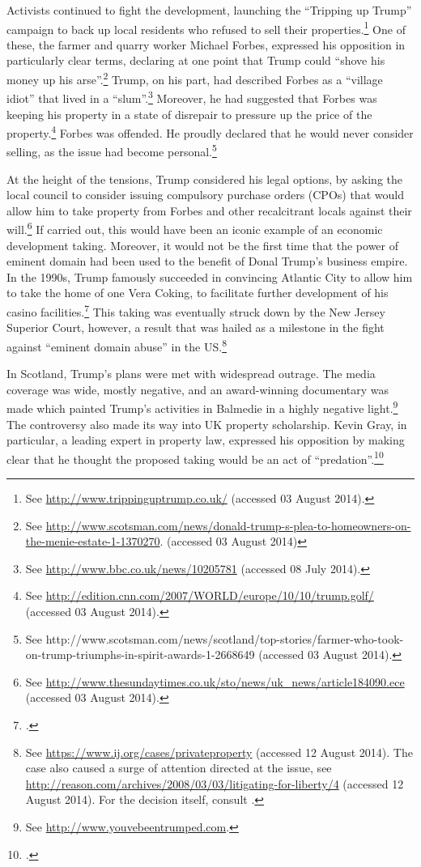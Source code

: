 \documentclass[12pt,a4paper]{book} %
\begin{document}
Activists continued to fight the development, launching the ``Tripping up Trump'' campaign to back up local residents who refused to sell their properties.\footnote{See \url{http://www.trippinguptrump.co.uk/} (accessed 03 August 2014).} One of these, the farmer and quarry worker Michael Forbes, expressed his opposition in particularly clear terms, declaring at one point that Trump could ``shove his money up his arse''.\footnote{See \url{http://www.scotsman.com/news/donald-trump-s-plea-to-homeowners-on-the-menie-estate-1-1370270}. (accessed 03 August 2014)} Trump, on his part, had described Forbes as a ``village idiot'' that lived in a ``slum''.\footnote{See \url{http://www.bbc.co.uk/news/10205781} (accessed 08 July 2014).} Moreover, he had suggested that Forbes was keeping his property in a state of disrepair to pressure up the price of the property.\footnote{See \url{http://edition.cnn.com/2007/WORLD/europe/10/10/trump.golf/} (accessed 03 August 2014).} Forbes was offended. He proudly declared that he would never consider selling, as the issue had become personal.\footnote{See http://www.scotsman.com/news/scotland/top-stories/farmer-who-took-on-trump-triumphs-in-spirit-awards-1-2668649 (accessed 03 August 2014).}

At the height of the tensions, Trump considered his legal options, by asking the local council to consider issuing compulsory purchase orders (CPOs) that would allow him to take property from Forbes and other recalcitrant locals against their will.\footnote{See \url{http://www.thesundaytimes.co.uk/sto/news/uk_news/article184090.ece} (accessed 03 August 2014).} If carried out, this would have been an iconic example of an economic development taking. Moreover, it would not be the first time that the power of eminent domain had been used to the benefit of Donal Trump's business empire. In the 1990s, Trump famously succeeded in convincing Atlantic City to allow him to take the home of one Vera Coking, to facilitate further development of his casino facilities.\footcite[297-301]{jones00} This taking was eventually struck down by the New Jersey Superior Court, however, a result that was hailed as a milestone in the fight against ``eminent domain abuse'' in the US.\footnote{See \url{https://www.ij.org/cases/privateproperty} (accessed 12 August 2014). The case also caused a surge of attention directed at the issue, see \url{http://reason.com/archives/2008/03/03/litigating-for-liberty/4} (accessed 12 August 2014). For the decision itself, consult \cite{banin98}.}

In Scotland, Trump's plans were met with widespread outrage. The media coverage was wide, mostly negative, and an award-winning documentary was made which painted Trump's activities in Balmedie in a highly negative light.\footnote{See \url{http://www.youvebeentrumped.com}.} The controversy also made its way into UK property scholarship. Kevin Gray, in particular, a leading expert in property law, expressed his opposition by making clear that he thought the proposed taking would be an act of ``predation''.\footcite{gray11}
\end{document}
